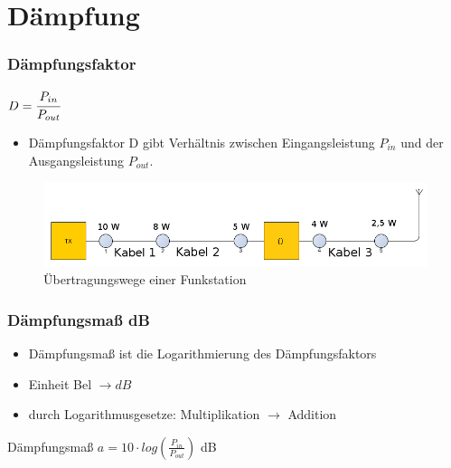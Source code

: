 

\subtitle{Technik Klasse E 10: \\
          Dezibel, Dämpfung \& Kabel \\[2em]}
\date{Stand 10.12.2015}



\section*{Dämpfung}

\begin{frame}
\frametitle{Dämpfungsfaktor}
\begin{center}
\begin{minipage}{0.3\textwidth}
	\huge{$ D = \cfrac{P_{in}}{P_{out}}$}
\end{minipage}
\begin{minipage}{0.6\textwidth}
\begin{itemize}
	\item Dämpfungsfaktor D gibt Verhältnis zwischen Eingangsleistung $P_{in}$
          und der Ausgangsleistung $P_{out}$.
\end{itemize}	
\end{minipage}
\vspace{1cm}	
\begin{figure}
\includegraphics[scale=0.7]{e10/ubertragung.png}
\caption{Übertragungswege einer Funkstation}
\end{figure}
\end{center}
\end{frame}


\begin{frame}
\frametitle{Dämpfungsmaß dB}
  \begin{itemize}
    \item Dämpfungsmaß ist die Logarithmierung des Dämpfungsfaktors
    \item Einheit Bel $\rightarrow dB$ 
    \item durch Logarithmusgesetze: Multiplikation $\rightarrow$ Addition
  \end{itemize}
  \vspace{0.5cm}
  \begin{block}{Dämpfungsmaß}
    \Huge{$a = 10 \cdot log(\frac{P_{in}}{P_{out}})$ dB}
  \end{block}
\end{frame}

